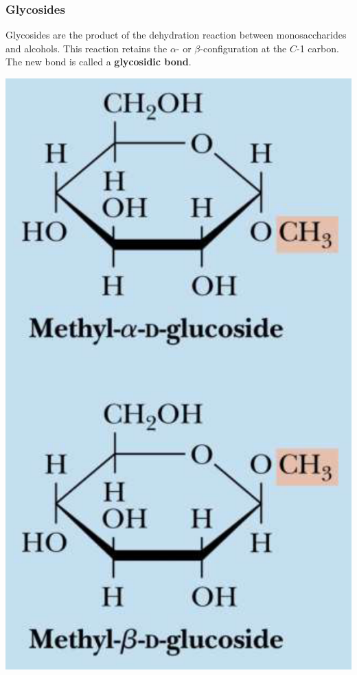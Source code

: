 \documentclass[11pt]{article}
\begin{document}
\newpage
\subsubsection{Glycosides}
\label{sec:orge630199}
Glycosides are the product of the dehydration reaction between monosaccharides and alcohols. This reaction retains the \(\alpha\)- or \(\beta\)-configuration at the \(C\)-1 carbon. The new bond is called a \textbf{glycosidic bond}.

\begin{center}
\includegraphics[scale=0.75]{./images/glycosides.png}
\end{center}
\end{document}
